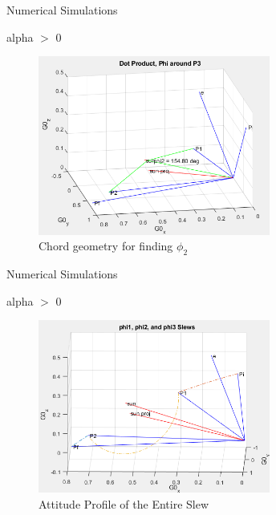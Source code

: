 \documentclass{beamer}
\begin{document}
\begin{frame}{Numerical Simulations}
	\begin{block}{alpha $>$ 0}
		\begin{figure}
			\label{fig:phi2_geometry}
			\includegraphics[width=3in]{figures/alphaNot0/chord_geometry_phi2.png}
			\caption{Chord geometry for finding $\phi_2$}
		\end{figure}

	\end{block}
	
	
\end{frame}
\begin{frame}{Numerical Simulations}
	\begin{block}{alpha $>$ 0}
		\begin{figure}[H]
			\label{fig:phi1_phi2_phi3}
			\includegraphics[width=3in]{figures/alphaNot0/phi1_phi2_phi3.png}
			\caption{Attitude Profile of the Entire Slew}
		\end{figure}
	\end{block}
\end{frame}
\end{document}
